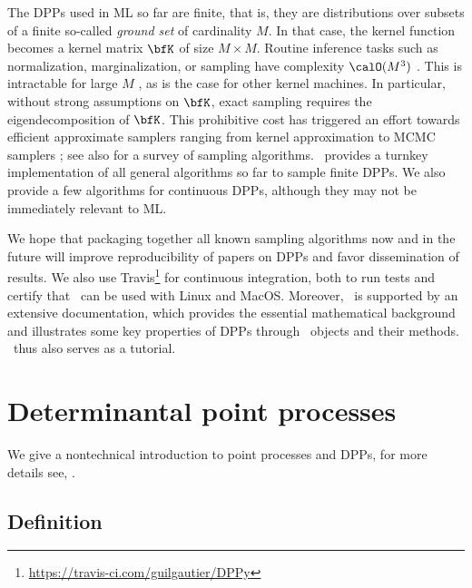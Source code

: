 \documentclass[twoside,11pt]{article}
\begin{document}
  The DPPs used in ML so far are finite, that is, they are distributions over subsets of a finite so-called \emph{ground set} of cardinality $M$.
  In that case, the kernel function becomes a kernel matrix $\bfK$ of size $M\times M$.
  Routine inference tasks such as normalization, marginalization, or sampling have complexity $\calO(M^3)$ \citep{KuTa12}.
  This is intractable for large $M$ \citep{Gil14}, as is the case for other kernel machines.
  In particular, without strong assumptions on $\bfK$, exact sampling requires the eigendecomposition of $\bfK$.
  This prohibitive cost has triggered an effort towards efficient approximate samplers ranging from kernel approximation \citep{AKFT13} to MCMC samplers \citep{AnGhRe16, LiJeSr16c, GaBaVa17}; see also \citet{TrBaAm18} for a survey of sampling algorithms.
  \DPPy\ provides a turnkey implementation of all general algorithms so far to sample finite DPPs.
  We also provide a few algorithms for continuous DPPs, although they may not be immediately relevant to ML.


  We hope that packaging together all known sampling algorithms now and in the future will improve reproducibility of papers on DPPs and favor dissemination of results.
  \setcounter{footnote}{5}
  We also use Travis\footnote{\url{https://travis-ci.com/guilgautier/DPPy}} for continuous integration, both to run tests and certify that \DPPy\ can be used with Linux and MacOS.
  Moreover, \DPPy\ is supported by an extensive documentation, which provides the essential mathematical background and illustrates some key properties of DPPs through \DPPy\ objects and their methods. \DPPy\ thus also serves as a tutorial.


\section{Determinantal point processes} %
\label{sec:determinantal_point_processes}

	We give a nontechnical introduction to point processes and DPPs, for more details see, \eg \citet{HKPV06}.

  \subsection{Definition} %
  \label{sub:definition}
\end{document}
